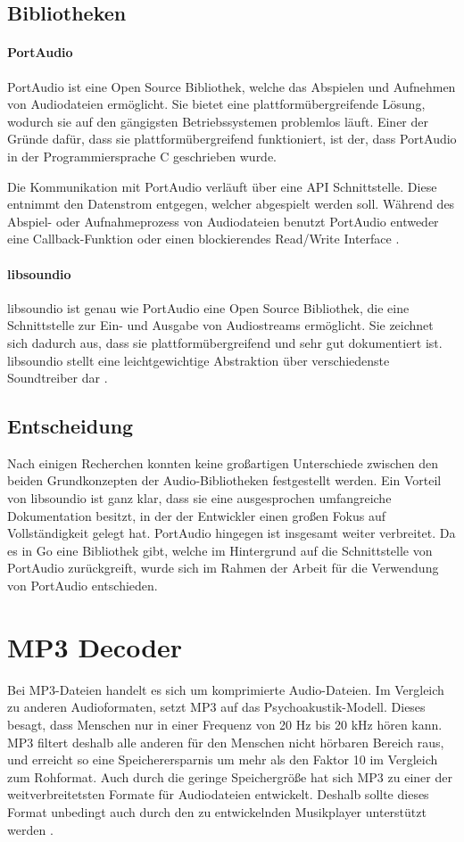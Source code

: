 \subsection{Bibliotheken}
\paragraph{PortAudio}
PortAudio ist eine Open Source Bibliothek, welche das Abspielen und Aufnehmen
von Audiodateien ermöglicht. Sie bietet eine plattformübergreifende Lösung,
wodurch sie auf den gängigsten Betriebssystemen problemlos läuft. Einer der
Gründe dafür, dass sie plattformübergreifend funktioniert, ist der, dass
PortAudio in der Programmiersprache C geschrieben wurde. \hfill

Die Kommunikation mit PortAudio verläuft über eine \ac{API} Schnittstelle.
Diese entnimmt den Datenstrom entgegen, welcher abgespielt werden soll. Während
des Abspiel- oder Aufnahmeprozess von Audiodateien benutzt PortAudio entweder
eine Callback-Funktion oder einen blockierendes Read/Write Interface
\autocite{PortAudio_2019}.

\paragraph{libsoundio}
libsoundio ist genau wie PortAudio eine Open Source Bibliothek, die eine
Schnittstelle zur Ein- und Ausgabe von Audiostreams ermöglicht. Sie zeichnet
sich dadurch aus, dass sie plattformübergreifend und sehr gut dokumentiert ist.
libsoundio stellt eine leichtgewichtige Abstraktion über verschiedenste
Soundtreiber dar \autocite{libsoundio_2019}.

\subsection{Entscheidung}
Nach einigen Recherchen konnten keine großartigen Unterschiede zwischen den
beiden Grundkonzepten der Audio-Bibliotheken festgestellt werden. Ein Vorteil von
libsoundio ist ganz klar, dass sie eine ausgesprochen umfangreiche
Dokumentation besitzt, in der der Entwickler einen großen Fokus auf
Vollständigkeit gelegt hat. PortAudio hingegen ist insgesamt weiter verbreitet.
Da es in Go eine Bibliothek gibt, welche im Hintergrund auf die Schnittstelle
von PortAudio zurückgreift, wurde sich im Rahmen der Arbeit für die
Verwendung von PortAudio entschieden.

\section{MP3 Decoder}
Bei \ac{MP3}-Dateien handelt es sich um komprimierte Audio-Dateien. Im Vergleich zu
anderen Audioformaten, setzt \ac{MP3} auf das Psychoakustik-Modell. Dieses besagt,
dass Menschen nur in einer Frequenz von 20 Hz bis 20 kHz hören kann. \ac{MP3}
filtert deshalb alle anderen für den Menschen nicht hörbaren Bereich raus, und
erreicht so eine Speicherersparnis um mehr als den Faktor 10 im Vergleich zum
Rohformat. Auch durch die geringe Speichergröße hat sich \ac{MP3} zu einer der weitverbreitetsten Formate für Audiodateien entwickelt. 
Deshalb sollte dieses Format unbedingt auch durch den zu entwickelnden Musikplayer unterstützt werden
\autocite{mp3}. \hfill

